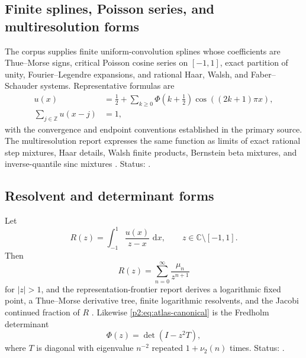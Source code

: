 \documentclass[11pt,oneside]{article}
\theoremstyle{definition}
\newcommand{\dd}{\,\mathrm d}
\newcommand{\C}{\mathbb C}
\newcommand{\Z}{\mathbb Z}
\newcommand{\vtwo}{\nu_2}
\begin{document}
\subsection{Finite splines, Poisson series, and multiresolution forms}

The corpus supplies finite uniform-convolution splines whose coefficients are
Thue--Morse signs, critical Poisson cosine series on $[-1,1]$, exact partition
of unity, Fourier--Legendre expansions, and rational Haar, Walsh, and
Faber--Schauder systems.  Representative formulas are
\begin{align}
 u(x)&=\frac12+\sum_{k\ge0}\Phi(k+\tfrac12)
                 \cos((2k+1)\pi x),                       \label{p2:eq:critical-cosine}\\
 \sum_{j\in\Z}u(x-j)&=1,                                  \label{p2:eq:partition-unity}
\end{align}
with the convergence and endpoint conventions established in the primary
source.  The multiresolution report expresses the same function as limits of
exact rational step mixtures, Haar details, Walsh finite products, Bernstein
beta mixtures, and inverse-quantile sinc mixtures \cite{p2:repoMultiresolution}.
Status: \statusknown.

\subsection{Resolvent and determinant forms}

Let
\begin{equation}
 R(z)=\int_{-1}^{1}\frac{u(x)}{z-x}\,\dd x,
 \qquad z\in\C\setminus[-1,1].                             \label{p2:eq:Cauchy-transform}
\end{equation}
Then
\begin{equation}
 R(z)=\sum_{n=0}^{\infty}\frac{\mu_n}{z^{n+1}}             \label{p2:eq:R-moment-series}
\end{equation}
for $|z|>1$, and the representation-frontier report derives a logarithmic
fixed point, a Thue--Morse derivative tree, finite logarithmic resolvents, and
the Jacobi continued fraction of $R$ \cite{p2:repoRepresentations}.  Likewise
\eqref{p2:eq:atlas-canonical} is the Fredholm determinant
\begin{equation}
 \Phi(z)=\det(I-z^2T),                                     \label{p2:eq:Fredholm}
\end{equation}
where $T$ is diagonal with eigenvalue $n^{-2}$ repeated $1+\vtwo(n)$ times.
Status: \statusknown.
\end{document}
